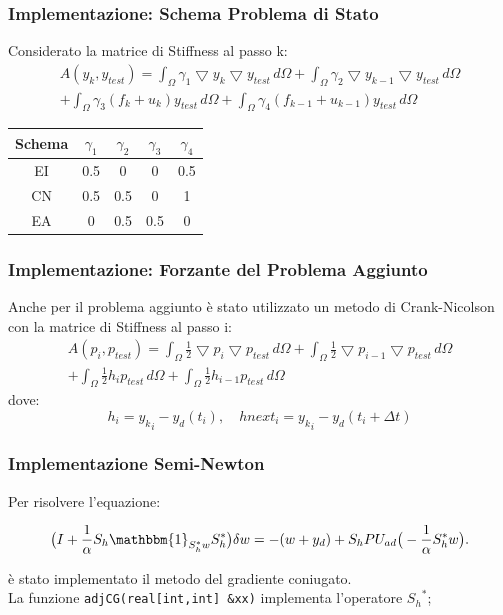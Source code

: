 \documentclass{beamer}
\theoremstyle{definition}
\theoremstyle{remark}
\theoremstyle{plain}
\theoremstyle{definition}
\begin{document}
\begin{frame}
\frametitle{Implementazione: Schema Problema di Stato}
Considerato la matrice di Stiffness al passo k:
\begin{multline*}
A(y_k,y_{test}) = \int_{\Omega} \gamma_1 \bigtriangledown y_k \bigtriangledown y_{test} \, d\Omega + \int_{\Omega} \gamma_2 \bigtriangledown y_{k-1} \bigtriangledown y_{test} \, d\Omega \\+ \int_{\Omega} \gamma_3 (f_{k}+u_k)y_{test} \, d\Omega + \int_{\Omega} \gamma_4 (f_{k-1}+u_{k-1})y_{test} \, d\Omega
\end{multline*}

\begin{table}
\centering
\begin{tabular}{|c|c|c|c|c|}
\hline
\textbf{Schema} & \textbf{$\gamma_1$} &\textbf{$\gamma_2$} & \textbf{$\gamma_3$} &\textbf{$\gamma_4$} \\
\hline
EI & 0.5 & 0 & 0 & 0.5 \\
\hline
CN & 0.5 & 0.5 & 0 & 1 \\
\hline
EA & 0 & 0.5 & 0.5 & 0\\
\hline
\end{tabular}
\end{table}
\end{frame}

\begin{frame}
\frametitle{Implementazione: Forzante del Problema Aggiunto}
Anche per il problema aggiunto è stato utilizzato un metodo di Crank-Nicolson con la matrice di Stiffness al passo i:
\begin{multline*}
A(p_i,p_{test}) = \int_{\Omega} \frac{1}{2}\bigtriangledown p_i \bigtriangledown p_{test} \, d\Omega + \int_{\Omega} \frac{1}{2} \bigtriangledown p_{i-1} \bigtriangledown p_{test} \, d\Omega \\+ \int_{\Omega} \frac{1}{2} h_i p_{test} \, d\Omega + \int_{\Omega} \frac{1}{2} h_{i-1} p_{test} \, d\Omega
\end{multline*}
dove:
\begin{equation*}
h_i = {y_k}_i - y_d(t_i), \quad
hnext_i = {y_k}_i - y_d(t_i+{\Delta}t)
\end{equation*}

\end{frame}

\begin{frame}
\frametitle{Implementazione Semi-Newton}
Per risolvere l'equazione:

\begin{equation*}
\big( I + \frac{1}{\alpha}S_h\mathbbm{1}_{S^*_hw}S^*_h\big)\delta w=-(w+y_d)+S_hP{U_{ad}}\big( -\frac{1}{\alpha}S^*_hw\big).
\end{equation*}

è stato implementato il metodo del gradiente coniugato.
\\
La funzione \texttt{adjCG(real[int,int] \&xx)} implementa l’operatore ${S_h}^*$; 

\end{frame}
\end{document}
